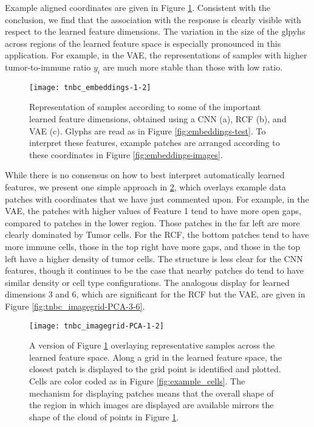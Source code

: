 Example aligned coordinates are given in Figure
\ref{fig:tnbc_important_features}. Consistent with the conclusion, we find that
the association with the response is clearly visible with respect to the learned
feature dimensions. The variation in the size of the glpyhs across regions of
the learned feature space is especially pronounced in this application. For
example, in the VAE, the representations of samples with higher tumor-to-immune
ratio $y_i$ are much more stable than those with low ratio.

\begin{figure}
  \centering
  \texttt{[image: tnbc\_embeddings-1-2]}
  \caption{Representation of samples according to some of the important learned
    feature dimensions, obtained using a CNN (a), RCF (b), and VAE (c). Glyphs
    are read as in Figure \ref{fig:embeddings-test}. To interpret these
    features, example patches are arranged according to these coordinates in
    Figure \ref{fig:embeddings-images}.}
  \label{fig:tnbc_important_features}
\end{figure}

While there is no consensus on how to best interpret automatically learned
features, we present one simple approach in \ref{fig:tnbc_imagegrid-PCA-1-2}, which
overlays example data patches with coordinates that we have just commented upon.
For example, in the VAE, the patches with higher values of Feature 1 tend to
have more open gaps, compared to patches in the lower region. Those patches in
the far left are more clearly dominated by Tumor cells. For the RCF, the bottom
patches tend to have more immune cells, those in the top right have more gaps,
and those in the top left have a higher density of tumor cells. The structure is
less clear for the CNN features, though it continues to be the case that nearby
patches do tend to have similar density or cell type configurations. The
analogous display for learned dimensions 3 and 6, which are significant for the
RCF but the VAE, are given in Figure \ref{fig:tnbc_imagegrid-PCA-3-6}.

\begin{figure}
  \centering
  \texttt{[image: tnbc\_imagegrid-PCA-1-2]}
  \caption{A version of Figure \ref{fig:tnbc_important_features} overlaying
    representative samples across the learned feature space. Along a grid in the
    learned feature space, the closest patch is displayed to the grid point is
    identified and plotted. Cells are color coded as in Figure
    \ref{fig:example_cells}. The mechanism for displaying patches means that the
    overall shape of the region in which images are displayed are available
    mirrors the shape of the cloud of points in Figure
    \ref{fig:tnbc_important_features}. }
  \label{fig:tnbc_imagegrid-PCA-1-2}
\end{figure}
